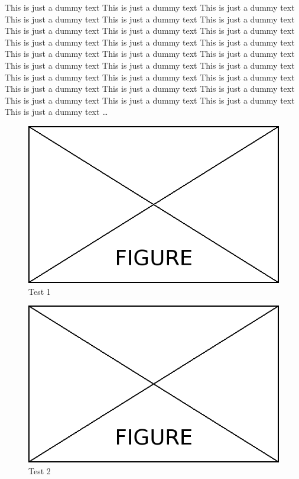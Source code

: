 \begin{paracol}{2}
	This is just a dummy text This is just a dummy text This is just a dummy text This is just a dummy text This is just a dummy text This is just a dummy text This is just a dummy text This is just a dummy text This is just a dummy text This is just a dummy text This is just a dummy text This is just a dummy text This is just a dummy text This is just a dummy text This is just a dummy text This is just a dummy text This is just a dummy text This is just a dummy text This is just a dummy text This is just a dummy text This is just a dummy text This is just a dummy text This is just a dummy text This is just a dummy text This is just a dummy text This is just a dummy text This is just a dummy text This is just a dummy text \dots
	
	\switchcolumn
	
	\begin{figure}[!h]
		\centering
		\includegraphics[width=0.3\textheight]{Content/Figures/figure.png}
		\caption{Test 1}
		\label{fig:test1}
	\end{figure}
	\vfill
	\begin{figure}[!h]
		\centering
		\includegraphics[width=0.3\textheight]{Content/Figures/figure.png}
		\caption{Test 2}
		\label{fig:test2}
	\end{figure}
\end{paracol}

